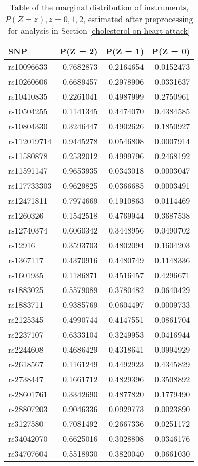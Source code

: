 \documentclass[
]{article}
\theoremstyle{plain}
\begin{document}
\begin{table}[H]
  \caption{Table of the marginal distribution of instruments, $P(Z = z), z=0,1,2$, estimated after preprocessing for analysis in Section \ref{cholesterol-on-heart-attack}}
  \label{tab:marginal-distribution-of-instruments-lung-cancer}
  \begin{minipage}{0.5\linewidth}
    \center
    
\begin{tabular}{lrrr}
\toprule
SNP & P(Z = 2) & P(Z = 1) & P(Z = 0)\\
\midrule
rs10096633 & 0.7682873 & 0.2164654 & 0.0152473\\
rs10260606 & 0.6689457 & 0.2978906 & 0.0331637\\
rs10410835 & 0.2261041 & 0.4987999 & 0.2750961\\
rs10504255 & 0.1141345 & 0.4474070 & 0.4384585\\
rs10804330 & 0.3246447 & 0.4902626 & 0.1850927\\
\addlinespace
rs112019714 & 0.9445278 & 0.0546808 & 0.0007914\\
rs11580878 & 0.2532012 & 0.4999796 & 0.2468192\\
rs11591147 & 0.9653935 & 0.0343018 & 0.0003047\\
rs117733303 & 0.9629825 & 0.0366685 & 0.0003491\\
rs12471811 & 0.7974669 & 0.1910863 & 0.0114469\\
\addlinespace
rs1260326 & 0.1542518 & 0.4769944 & 0.3687538\\
rs12740374 & 0.6060342 & 0.3448956 & 0.0490702\\
rs12916 & 0.3593703 & 0.4802094 & 0.1604203\\
rs1367117 & 0.4370916 & 0.4480749 & 0.1148336\\
rs1601935 & 0.1186871 & 0.4516457 & 0.4296671\\
\addlinespace
rs1883025 & 0.5579089 & 0.3780482 & 0.0640429\\
rs1883711 & 0.9385769 & 0.0604497 & 0.0009733\\
rs2125345 & 0.4990744 & 0.4147551 & 0.0861704\\
rs2237107 & 0.6333104 & 0.3249953 & 0.0416944\\
rs2244608 & 0.4686429 & 0.4318641 & 0.0994929\\
\addlinespace
rs2618567 & 0.1161249 & 0.4492923 & 0.4345829\\
rs2738447 & 0.1661712 & 0.4829396 & 0.3508892\\
rs28601761 & 0.3342690 & 0.4877820 & 0.1779490\\
rs28807203 & 0.9046336 & 0.0929773 & 0.0023890\\
rs3127580 & 0.7081492 & 0.2667336 & 0.0251172\\
\addlinespace
rs34042070 & 0.6625016 & 0.3028808 & 0.0346176\\
rs34707604 & 0.5518930 & 0.3820040 & 0.0661030\\
\bottomrule
\end{tabular}



\end{minipage}
\end{table}
\end{document}
